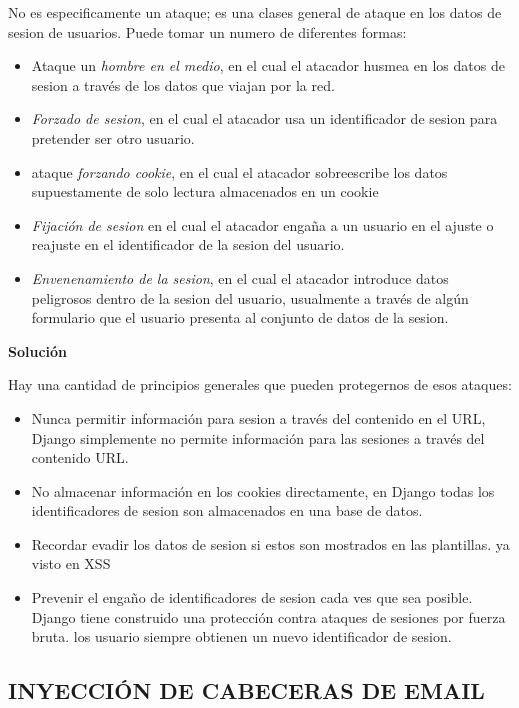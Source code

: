 No es especificamente un ataque; es una clases general de ataque en los datos de sesion de usuarios. Puede tomar un numero de diferentes formas:

\begin{itemize}
 \item Ataque un \textit{hombre en el medio}, en el cual el atacador husmea en los datos de sesion a través de los datos que viajan por la red.
 \item \textit{Forzado de sesion}, en el cual el atacador usa un identificador de sesion para pretender ser otro usuario.
 \item ataque \textit{forzando cookie}, en el cual el atacador sobreescribe los datos supuestamente de solo lectura almacenados en un cookie
 \item \textit{Fijación de sesion} en el cual el atacador engaña a un usuario en el ajuste o reajuste en el identificador de la sesion del usuario.
 \item \textit{Envenenamiento de la sesion}, en el cual el atacador introduce datos peligrosos dentro de la sesion del usuario, usualmente a través de algún formulario que el usuario presenta al conjunto de datos de la sesion.
\end{itemize}

\textbf{Solución}

Hay una cantidad de principios generales que pueden protegernos de esos ataques:

\begin{itemize}
 \item Nunca permitir información para sesion a través del contenido en el URL, Django simplemente no permite información para las sesiones a través del contenido URL.
 \item No almacenar información en los cookies directamente, en Django todas los identificadores de sesion son almacenados en una base de datos.
 \item Recordar evadir los datos de sesion si estos son mostrados en las plantillas. ya visto en XSS
 \item Prevenir el engaño de identificadores de sesion cada ves que sea posible. Django tiene construido una protección contra ataques de sesiones por fuerza bruta. los usuario siempre obtienen un nuevo identificador de sesion. 
\end{itemize}

\subsection{INYECCIÓN DE CABECERAS DE EMAIL}

